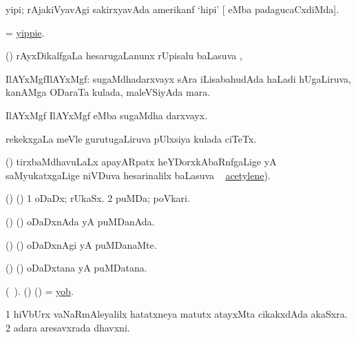 \bentry
{} 
\gl{\nA} 
\bmng
yipi; rAjakiVyavAgi sakirxyavAda amerikanf `hipi'   [ eMba padagucaCxdiMda].
\emng
\eentry

\bentry
{} 
\gl{\nA}
\bmng
= \hyperlink{yippie}{yippie}.
\emng
\eentry

\bentry
{} 
\gl{\uparx}  
\bmng
(\ravi) rAyxDikalfgaLa hesarugaLanunx rUpisalu baLasuva \uparx, \udA\ 
\emng
\eentry

\bentry
{} 
\gl{\nA} 
\bmng
IlAYxMgfIlAYxMgf: 
\banum
{}  sugaMdhadarxvayx sAra iLisabahudAda haLadi hUgaLiruva, kanAMga ODaraTa kulada, maleVSiyAda mara. 

  IlAYxMgf IlAYxMgf eMba sugaMdha darxvayx. 
\eanum
\emng
\eentry

\bentry
{}
\gl{\saMkiSx} 
\bmng
{}
\emng
\eentry

\bentry
{} 
\gl{\nA} 
\bmng
rekekxgaLa meVle   gurutugaLiruva pUlxsiya kulada ciTeTx.
\emng
\eentry

\bentry
{} 
\gl{\uparx} 
\bmng
(\ravi) tirxbaMdhavuLaLx apayARpatx heYDorxkAbaRnfgaLige yA saMyukatxgaLige niVDuva hesarinalilx baLasuva \uparx\  \hyperref{kandict_a.pdf}{A}{acetylene}{acetylene}).
\emng
\eentry

\bentry
{} 
\gl{\nA} 
\bmng
(\birx) (\ashi) 
\bnum
\num{1} oDaDx; rUkaSx. 
\num{2} puMDa; poVkari.
\enum
\emng
\eentry

\bentry
{} 
\gl{\gu} 
\bmng
(\birx) (\ashi) oDaDxnAda yA puMDanAda.
\emng
\eentry

\bentry
{} 
\gl{\kirxvi} 
\bmng
(\birx) (\ashi) oDaDxnAgi yA puMDanaMte.
\emng
\eentry

\bentry
{} 
\gl{\nA} 
\bmng
(\birx) (\ashi) oDaDxtana yA puMDatana.
\emng
\eentry

\bentry
{} 
\gl{\nA} 
\bmng
(\bava\ ). 
(\birx) (\ashi) = \hyperlink{yob}{yob}.
\emng
\eentry

\bentry
{} 
\gl{\nA} 
\bmng
\bnum
\num{1} hiVbUrx vaNaRmAleyalilx  hatatxneya matutx atayxMta cikakxdAda akaSxra. 
\num{2} adara aresavxrada dhavxni.
\enum
\emng
\eentry

